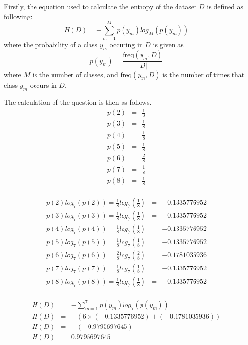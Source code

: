 \documentclass[10pt]{article}
\begin{document}
Firstly, the equation used to calculate the entropy of the dataset $D$ is defined as following:
\begin{equation*}
    H(D) = - \sum_{m=1}^{M} p(y_m)log_M \left( p(y_m) \right)
\end{equation*}
where the probability of a class $y_m$ occuring in $D$ is given as
\begin{equation*}
    p(y_m) = \frac{\text{freq}(y_m, D)}{|D|}
\end{equation*}
where $M$ is the number of classes, and $\text{freq}(y_m, D)$ is the number of times that class $y_m$
occurs in $D$.

The calculation of the question is then as follows.
\begin{eqnarray*}
    p(2) &=& \frac{1}{8} \\
    p(3) &=& \frac{1}{8} \\
    p(4) &=& \frac{1}{8} \\
    p(5) &=& \frac{1}{8} \\
    p(6) &=& \frac{2}{8} \\
    p(7) &=& \frac{1}{8} \\
    p(8) &=& \frac{1}{8} \\
\end{eqnarray*}

\begin{eqnarray*}
    p(2) log_7 \left( p(2) \right) = \frac{1}{8} log_7 \left( \frac{1}{8} \right) &=& -0.1335776952\\
    p(3) log_7 \left( p(3) \right) = \frac{1}{8} log_7 \left( \frac{1}{8} \right) &=& -0.1335776952\\
    p(4) log_7 \left( p(4) \right) = \frac{1}{8} log_7 \left( \frac{1}{8} \right) &=& -0.1335776952\\
    p(5) log_7 \left( p(5) \right) = \frac{1}{8} log_7 \left( \frac{1}{8} \right) &=& -0.1335776952\\
    p(6) log_7 \left( p(6) \right) = \frac{2}{8} log_7 \left( \frac{2}{8} \right) &=& -0.1781035936\\
    p(7) log_7 \left( p(7) \right) = \frac{1}{8} log_7 \left( \frac{1}{8} \right) &=& -0.1335776952\\
    p(8) log_7 \left( p(8) \right) = \frac{1}{8} log_7 \left( \frac{1}{8} \right) &=& -0.1335776952\\
\end{eqnarray*}

\begin{eqnarray*}
    H(D) &=& - \sum_{m=1}^{7} p(y_m) log_7 \left( p(y_m) \right) \\
    H(D) &=& - \left( 6\times(-0.1335776952) + (-0.1781035936) \right) \\
    H(D) &=& - (-0.9795697645) \\
    H(D) &=& 0.9795697645
\end{eqnarray*}
\end{document}
